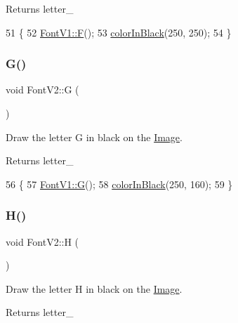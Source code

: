 \begin{DoxyReturn}{Returns}
letter\+\_\+ 
\end{DoxyReturn}

\begin{DoxyCode}
51                \{
52     \mbox{\hyperlink{class_font_v1_a40dd925bee9092d13ba1a00546cc7160}{FontV1::F}}();
53     \mbox{\hyperlink{class_font_v2_a04f2501961bc286ce70fbb6a840b0e8a}{colorInBlack}}(250, 250);
54 \}
\end{DoxyCode}
\mbox{\label{class_font_v2_a27ece9cc80af5c5d32cad07f00ed714c}} 
\subsubsection{\texorpdfstring{G()}{G()}}
{\footnotesize\ttfamily void Font\+V2\+::G (\begin{DoxyParamCaption}{ }\end{DoxyParamCaption})}



Draw the letter G in black on the \mbox{\hyperlink{class_image}{Image}}. 

\begin{DoxyReturn}{Returns}
letter\+\_\+ 
\end{DoxyReturn}

\begin{DoxyCode}
56                \{
57     \mbox{\hyperlink{class_font_v1_a9806041ba05556826ba6b4a0760fcee4}{FontV1::G}}();
58     \mbox{\hyperlink{class_font_v2_a04f2501961bc286ce70fbb6a840b0e8a}{colorInBlack}}(250, 160);
59 \}
\end{DoxyCode}
\mbox{\label{class_font_v2_af03f8d436cc22f57b2bdd471b265896e}} 
\subsubsection{\texorpdfstring{H()}{H()}}
{\footnotesize\ttfamily void Font\+V2\+::H (\begin{DoxyParamCaption}{ }\end{DoxyParamCaption})}



Draw the letter H in black on the \mbox{\hyperlink{class_image}{Image}}. 

\begin{DoxyReturn}{Returns}
letter\+\_\+ 
\end{DoxyReturn}

